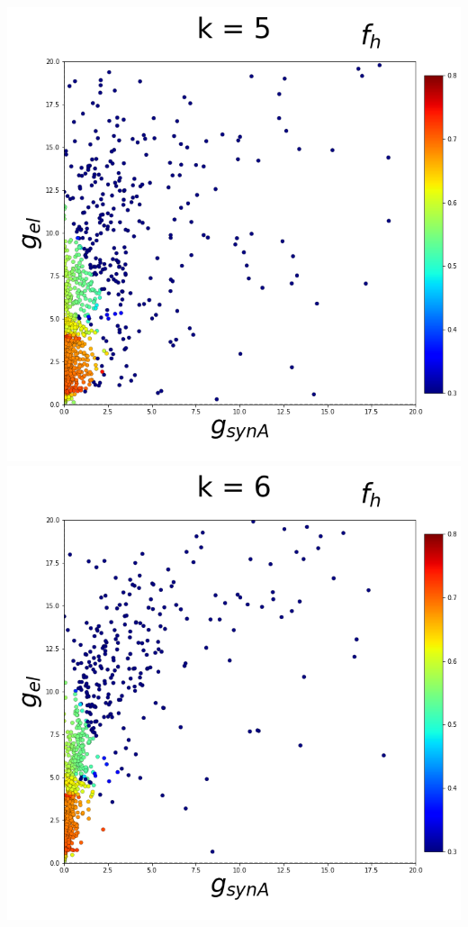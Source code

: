 \documentclass[11pt]{article}
\begin{document}
\begin{center}
\includegraphics[scale=0.125]{DSN_figs/STGCircuit_DSN_c=0_rs=3_k=5.png}
\includegraphics[scale=0.125]{DSN_figs/STGCircuit_DSN_c=0_rs=3_k=6.png}

\end{center}
\end{document}
